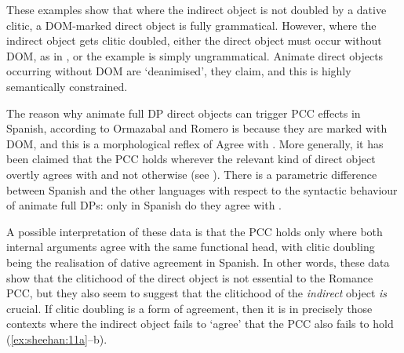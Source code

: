 \documentclass[output=paper,colorlinks,citecolor=brown,nonflat]{./langscibook}
\begin{document}
These examples show that where the indirect object is not doubled by a dative clitic, a DOM-marked direct object is fully grammatical. However, where the indirect object gets clitic doubled, either the direct object must occur without DOM, as in , or the example is simply ungrammatical. Animate direct objects occurring without DOM are ‘deanimised’, they claim, and this is highly semantically constrained. 

The reason why animate full DP direct objects can trigger PCC effects in Spanish, according to Ormazabal and Romero is because they are marked with DOM, and this is a morphological reflex of Agree with \liv . More generally, it has been claimed that the PCC holds wherever the relevant kind of direct object overtly agrees with \liv and not otherwise (see \citealt{Preminger2019}). There is a parametric difference between Spanish and the other languages with respect to the syntactic behaviour of animate full DPs: only in Spanish do they agree with \liv . 

A possible interpretation of these data is that the PCC holds only where both internal arguments agree with the same functional head, with clitic doubling being the realisation of dative agreement in Spanish. In other words, these data show that the clitichood of the direct object is not essential to the Romance PCC, but they also seem to suggest that the clitichood of the \textit{indirect} object \textit{is} crucial. If clitic doubling is a form of agreement, then it is in precisely those contexts where the indirect object fails to ‘agree’ that the PCC also fails to hold (\ref{ex:sheehan:11a}--b). 
\end{document}
